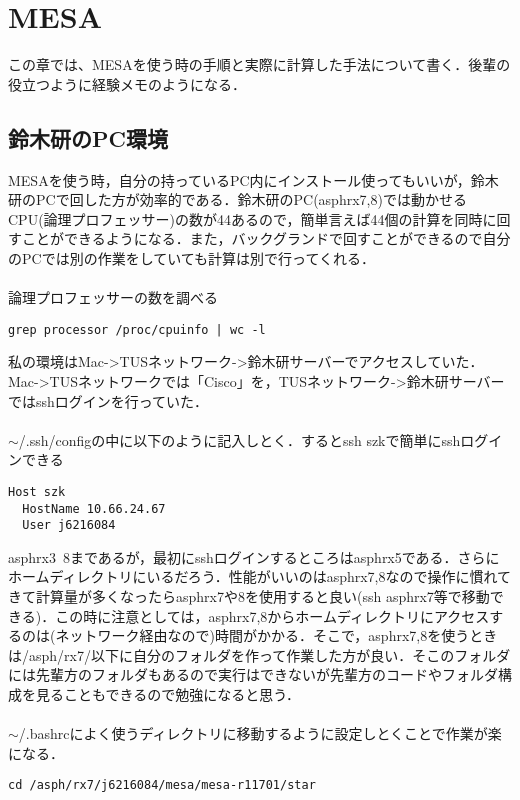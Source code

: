 \chapter{MESA}
\label{chap:mesa_method}

この章では、MESA\cite{mesa}を使う時の手順と実際に計算した手法について書く．後輩の役立つように経験メモのようになる．

\section{鈴木研のPC環境}

MESAを使う時，自分の持っているPC内にインストール使ってもいいが，鈴木研のPCで回した方が効率的である．鈴木研のPC(asphrx7,8)では動かせるCPU(論理プロフェッサー)の数が44あるので，簡単言えば44個の計算を同時に回すことができるようになる．また，バックグランドで回すことができるので自分のPCでは別の作業をしていても計算は別で行ってくれる． \\ \\
論理プロフェッサーの数を調べる
\begin{lstlisting}[basicstyle=\ttfamily\footnotesize, frame=single]
grep processor /proc/cpuinfo | wc -l
\end{lstlisting}

私の環境はMac->TUSネットワーク->鈴木研サーバーでアクセスしていた．Mac->TUSネットワークでは「Cisco」を，TUSネットワーク->鈴木研サーバーではsshログインを行っていた．\\ \\
$\sim$/.ssh/configの中に以下のように記入しとく．するとssh szkで簡単にsshログインできる
\begin{lstlisting}[basicstyle=\ttfamily\footnotesize, frame=single]
Host szk
  HostName 10.66.24.67
  User j6216084
\end{lstlisting}

asphrx3~8まであるが，最初にsshログインするところはasphrx5である．さらにホームディレクトリにいるだろう．性能がいいのはasphrx7,8なので操作に慣れてきて計算量が多くなったらasphrx7や8を使用すると良い(ssh asphrx7等で移動できる)．この時に注意としては，asphrx7,8からホームディレクトリにアクセスするのは(ネットワーク経由なので)時間がかかる．そこで，asphrx7,8を使うときは/asph/rx7/以下に自分のフォルダを作って作業した方が良い．そこのフォルダには先輩方のフォルダもあるので実行はできないが先輩方のコードやフォルダ構成を見ることもできるので勉強になると思う．\\ \\
$\sim$/.bashrcによく使うディレクトリに移動するように設定しとくことで作業が楽になる．
\begin{lstlisting}[basicstyle=\ttfamily\footnotesize, frame=single]
cd /asph/rx7/j6216084/mesa/mesa-r11701/star
\end{lstlisting}


